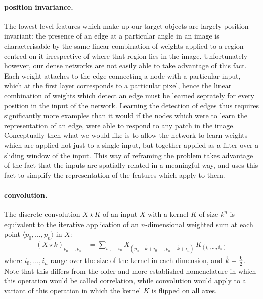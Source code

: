 \documentclass[msc]{infthesis}
\begin{document}
\paragraph*{position invariance.}
%
The lowest level features which make up our target objects are largely position invariant:
the presence of an edge at a particular angle in an image is characterisable by the same linear
combination of weights applied to a region centred on it irrespective of where that region lies
in the image.
%
Unfortunately however, our dense networks are not easily able to take advantage of this fact.
Each weight attaches to the edge connecting a node with a particular input, which at the first
layer corresponds to a particular pixel, hence the linear combination of weights which detect
an edge must be learned seprately for every position in the input of the network.  Learning the
detection of edges thus requires significantly more examples than it would if the nodes which
were to learn the representation of an edge, were able to respond to any patch in the image.
%
Conceptually then what we would like is to allow the network to learn weights which are applied
not just to a single input, but together applied as a filter over a sliding window of the input.
This way of reframing the problem takes advantage of the fact that the inputs are spatially
related in a meaningful way, and uses this fact to simplify the representation of the features
which apply to them.


\paragraph*{convolution.}
%
The discrete convolution \(X \star K\) of an input \(X\) with a kernel \(K\) of size \(k^n\) is
equivalent to the iterative application of an \(n\)-dimensional weighted sum at each point
\(\langle p_0, \ldots, p_n \rangle\) in \(X\):
%
\begin{align}
  \label{eq:convolution}
  ( X \star k )_{p_{0}, \ldots, p_{n}}
  &=
    \sum_{i_0, \ldots, i_{n}} X_{(p_0 - \hat{k} + i_0, \ldots, p_n - \hat{k} + i_n)} \, K_{(i_0, \ldots, i_n)}
\end{align}
%
where \(i_0, \ldots, i_n\) range over the size of the kernel in each dimension, and \(\hat{k} =
{k \over 2}\).  Note that this differs from the older and more established nomenclature in which
this operation would be called correlation, while convolution would apply to a variant of this
operation in which the kernel \(K\) is flipped on all axes.
\end{document}
